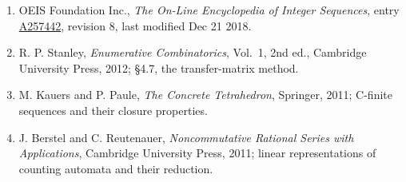 \documentclass[11pt]{article}
\theoremstyle{definition}
\begin{document}
\begin{enumerate}

\item OEIS Foundation Inc., \emph{The On-Line Encyclopedia of Integer Sequences}, entry \href{https://oeis.org/A257442}{A257442}, revision 8, last modified Dec 21 2018.

\item R. P. Stanley, \emph{Enumerative Combinatorics}, Vol.~1, 2nd ed., Cambridge University Press, 2012; \S4.7, the transfer-matrix method.

\item M. Kauers and P. Paule, \emph{The Concrete Tetrahedron}, Springer, 2011; C-finite sequences and their closure properties.

\item J. Berstel and C. Reutenauer, \emph{Noncommutative Rational Series with Applications}, Cambridge University Press, 2011; linear representations of counting automata and their reduction.

\end{enumerate}
\end{document}
